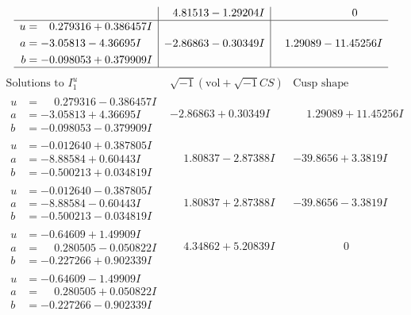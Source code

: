 \documentclass[1p]{elsarticle_modified}
\theoremstyle{definition}
\newcommand{\I}{\sqrt{-1}}
\begin{document}
$$\begin{array}{c|c|c}
 & \phantom{-}4.81513 - 1.29204 I & \phantom{-0.000000 } 0 \\ \hline\begin{aligned}
u &= \phantom{-}0.279316 + 0.386457 I \\
a &= -3.05813 - 4.36695 I \\
b &= -0.098053 + 0.379909 I\end{aligned}
 & -2.86863 - 0.30349 I & \phantom{-}1.29089 - 11.45256 I\\
 \hline 
 \end{array}$$\newpage$$\begin{array}{c|c|c}  
\text{Solutions to }I^u_{1}& \I (\text{vol} + \sqrt{-1}CS) & \text{Cusp shape}\\
 \hline 
\begin{aligned}
u &= \phantom{-}0.279316 - 0.386457 I \\
a &= -3.05813 + 4.36695 I \\
b &= -0.098053 - 0.379909 I\end{aligned}
 & -2.86863 + 0.30349 I & \phantom{-}1.29089 + 11.45256 I \\ \hline\begin{aligned}
u &= -0.012640 + 0.387805 I \\
a &= -8.88584 + 0.60443 I \\
b &= -0.500213 + 0.034819 I\end{aligned}
 & \phantom{-}1.80837 - 2.87388 I & -39.8656 + 3.3819 I \\ \hline\begin{aligned}
u &= -0.012640 - 0.387805 I \\
a &= -8.88584 - 0.60443 I \\
b &= -0.500213 - 0.034819 I\end{aligned}
 & \phantom{-}1.80837 + 2.87388 I & -39.8656 - 3.3819 I \\ \hline\begin{aligned}
u &= -0.64609 + 1.49909 I \\
a &= \phantom{-}0.280505 - 0.050822 I \\
b &= -0.227266 + 0.902339 I\end{aligned}
 & \phantom{-}4.34862 + 5.20839 I & \phantom{-0.000000 } 0 \\ \hline\begin{aligned}
u &= -0.64609 - 1.49909 I \\
a &= \phantom{-}0.280505 + 0.050822 I \\
b &= -0.227266 - 0.902339 I\end{aligned}

\end{array}$$
\end{document}
